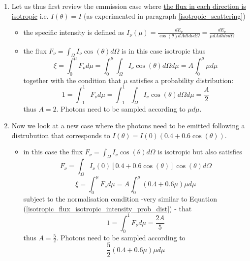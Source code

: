 \documentclass[../main/main.tex]{subfiles}
\begin{document}
\begin{enumerate}
\item Let us thus first review the emmission case where \underline{the flux in each direction is isotropic} i.e. $I(\theta) = I$ (as experimented in paragraph \ref{isotropic_scattering})
\begin{itemize}
\item the specific intensity is defined as $I_{\nu}(\mu) = \frac{dE_{\nu}}{\cos(\theta) dA dt d\nu d\Omega} = \frac{dE_{\nu}}{\mu dA dt d\nu d\Omega}$ 
\item the flux $F_{\nu} = \int_{\Omega} I_{\nu} \cos(\theta) d\Omega$ is in this case isotropic thus
\begin{equation}
\xi = \int_0^{\mu} F_{\nu} d\mu = \int_0^{\mu} \int_{\Omega} I_{\nu} \cos(\theta) d\Omega d\mu = A \int_0^{\mu} \mu d\mu   
\end{equation}
together with the condition that $\mu$ satisfies a probability distribution: 
\begin{equation}
1 = \int_{-1}^{1} F_{\nu} d\mu = \int_{-1}^{1} \int_{\Omega} I_{\nu} \cos(\theta) d\Omega d\mu = \frac{A}{2}
\label{isotropic_flux_isotropic_intensity_prob_dist}
\end{equation}
thus $A=2$. Photons need to be sampled according to $\mu d\mu$.
\end{itemize}

\item Now we look at a new case where the photons need to be emitted following a distrubution that corresponds to $I(\theta) = I(0)(0.4+0.6\cos(\theta))$. 
\begin{itemize}
\item in this case the flux $F_{\nu} = \int_{\Omega} I_{\nu} \cos(\theta) d\Omega$ is isotropic but also satisfies
\begin{equation}
F_{\nu} = \int_{\Omega} I_{\nu}(0)[0.4+0.6\cos(\theta)] \cos(\theta) d\Omega
\end{equation} 
\noindent{}
\begin{equation}
\xi = \int_0^{\mu} F_{\nu} d\mu = A \int_0^{\mu} (0.4+0.6\mu) \mu d\mu   
\end{equation}
subject to the normalisation condition -very similar to Equation (\ref{isotropic_flux_isotropic_intensity_prob_dist}) - that
\begin{equation}
1 = \int_{0}^{1} F_{\nu} d\mu = \frac{2A}{5}
\end{equation}
thus $A = \frac{5}{2}$. Photons need to be sampled according to
\begin{equation}
\frac{5}{2}(0.4+0.6\mu)\mu d\mu
\label{prob_dist_Eddington}
\end{equation}
\end{itemize}


\end{enumerate}
\end{document}
